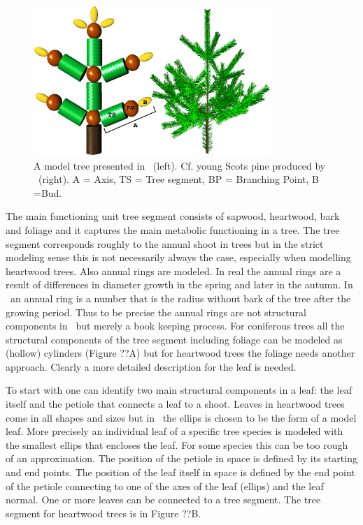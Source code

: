 \begin{figure}[h]
\begin{center}
\includegraphics[width=0.8\textwidth,height=0.5\textwidth]{Lignum3D.eps}
\caption{\label{fig:struct} A model tree presented in \lignum\
(left). Cf. young Scots pine produced by \lignum\ (right). A = Axis, 
TS = Tree segment, BP = Branching Point, B =Bud.}
\end{center}
\end{figure}

The main functioning unit tree segment consists of sapwood, heartwood,
bark and foliage and it  captures the main  metabolic functioning in a
tree.  The  tree segment  corresponds roughly  to the  annual shoot in
trees but in the strict modeling sense this  is not necessarily always
the case, especially when modelling heartwood trees. Also annual rings
are modeled.  In real the annual rings  are a result of differences in
diameter growth in the spring and later in the autumn.  In \lignum\ an
annual ring  is a number  that is the  radius without bark of the tree
after the growing period.  Thus to be precise the annual rings are not
structural components  in \lignum\ but merely  a book keeping process.
For coniferous trees all the structural components of the tree segment
including foliage can be   modeled as (hollow) cylinders  (Figure ??A)
but for heartwood trees the foliage needs another approach.  Clearly a
more detailed description for the leaf is needed.

To start  with one  can identify two  main structural  components in a
leaf: the leaf itself and the petiole that connects a leaf to a shoot.
Leaves in heartwood trees come in all shapes and sizes but in \lignum\
the ellips is chosen to  be the form of a  model leaf.  More precisely
an individual leaf of a   specific tree species   is modeled with  the
smallest ellips that encloses the leaf.  For  some species this can be
too rough of  an approximation.  The position  of the petiole in space
is defined by  its starting and end  points.  The position of the leaf
itself in space is defined by the end  point of the petiole connecting
to one of the axes of the  leaf (ellips) and the  leaf normal.  One or
more leaves can be connected to a tree segment.   The tree segment for
heartwood trees is in Figure ??B.

